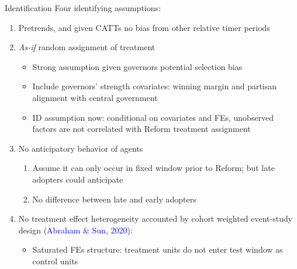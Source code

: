 \documentclass{beamer}
\begin{document}
\begin{frame}[label=identification2]{Identification}
Four identifying assumptions: 
\begin{enumerate}
 		  \setlength\itemsep{0.5em}   
	\item Pretrends, and given CATTs no bias from other relative timer periods
	\item {\it As-if} random assignment of treatment
	\begin{itemize}
		\item Strong assumption given governors potential selection bias
		\item Include governors' strength covariates: winning margin and partisan alignment with central government
		\item ID assumption now: conditional on covariates and FEs, unobserved factors are not correlated with Reform treatment assignment
	\end{itemize}
	\item No anticipatory behavior of agents
		\begin{enumerate}
		\item Assume it can only occur in fixed window prior to Reform; but late adopters could anticipate
		\item No difference between late and early adopters \hyperlink{event_by_event}{} 
		\end{enumerate}
 
 \item No treatment effect heterogeneity accounted by cohort weighted event-study design (\textcolor{blue}{Abraham \& Sun, 2020}): 
 		\begin{itemize}
		\item \alert{Saturated FEs structure: treatment units do not enter test window as control units} 
		\end{itemize}
\end{enumerate}
\bigskip 
\end{frame}
\end{document}
